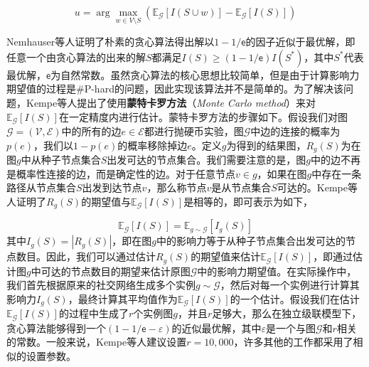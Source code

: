 \begin{equation}\label{eq:greedyIM}
    u=\arg\max\limits_{w \in V \setminus S}\left({\mathbb{E}_\mathcal{G}\left[I\left(S\cup w\right)\right]-\mathbb{E}_\mathcal{G}\left[I\left(S\right)\right]}\right)
\end{equation}

Nemhauser等人证明了朴素的贪心算法得出解以$1-1/\mathsf{e}$的因子近似于最优解，即任意一个由贪心算法的出来的解$S$都满足$I\left(S\right) \geq (1-1/\mathsf{e}) I\left(S^{\ast}\right)$，其中$S^{\ast}$代表最优解，$\mathsf{e}$为自然常数。虽然贪心算法的核心思想比较简单，但是由于计算影响力期望值的过程是\#P-hard的问题，因此实现该算法并不是简单的。为了解决该问题，Kempe等人提出了使用\textbf{蒙特卡罗方法}（\textit{Monte Carlo method}）来对$\mathbb{E}_\mathcal{G}\left[I\left(S\right)\right]$在一定精度内进行估计。蒙特卡罗方法的步骤如下。假设我们对图$\mathcal{G}=\left(\mathcal{V},\mathcal{E}\right)$中的所有的边$e\in\mathcal{E}$都进行抛硬币实验，图$\mathcal{G}$中边的连接的概率为$p\left(e\right)$，我们以$1-p\left(e\right)$的概率移除掉边$e$。定义$g$为得到的结果图，$R_g\left(S\right)$为在图$g$中从种子节点集合$S$出发可达的节点集合。我们需要注意的是，图$g$中的边不再是概率性连接的边，而是确定性的边。对于任意节点$v\in g$，如果在图$g$中存在一条路径从节点集合$S$出发到达节点$v$，那么称节点$v$是从节点集合$S$可达的。Kempe等人证明了$R_g\left(S\right)$的期望值与$\mathbb{E}_\mathcal{G}\left[I\left(S\right)\right]$是相等的，即可表示为如下，

\begin{equation}\label{eq:influenceSpread}
    \mathbb{E}_\mathcal{G}\left[I\left(S\right)\right] = \mathbb{E}_{g\sim\mathcal{G}}\left[I_g\left(S\right)\right]
\end{equation}
其中$I_g\left(S\right) = \left\vert{R_g\left(S\right)}\right\vert$，即在图$g$中的影响力等于从种子节点集合出发可达的节点数目。因此，我们可以通过估计$R_g\left(S\right)$的期望值来估计$\mathbb{E}_\mathcal{G}\left[I\left(S\right)\right]$，即通过估计图$g$中可达的节点数目的期望来估计原图$\mathcal{G}$中的影响力期望值。在实际操作中，我们首先根据原来的社交网络生成多个实例$g\sim\mathcal{G}$，然后对每一个实例进行计算其影响力$I_g\left(S\right)$，最终计算其平均值作为$\mathbb{E}_\mathcal{G}\left[I\left(S\right)\right]$的一个估计。假设我们在估计$\mathbb{E}_\mathcal{G}\left[I\left(S\right)\right]$的过程中生成了$r$个实例图$g$，并且$r$足够大，那么在独立级联模型下，贪心算法能够得到一个$\left(1-1/\mathsf{e}-\varepsilon\right)$的近似最优解，其中$\varepsilon$是一个与图$\mathcal{G}$和$r$相关的常数。一般来说，Kempe等人建议设置$r=10,000$，许多其他的工作都采用了相似的设置参数。

